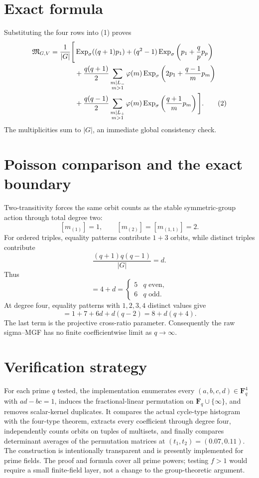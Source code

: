 \documentclass[11pt]{article}
\begin{document}
\section{Exact formula}
Substituting the four rows into (1) proves
\begin{align}
\mathfrak M_{G,V}=\frac1{|G|}\Bigg[&\operatorname{Exp}_{\sigma}((q+1)p_1)
+(q^2-1)\operatorname{Exp}_{\sigma}\left(p_1+\frac qp p_p\right)\notag\\
&+\frac{q(q+1)}2\sum_{\substack{m\mid L_-\\m>1}}\varphi(m)
 \operatorname{Exp}_{\sigma}\left(2p_1+\frac{q-1}{m}p_m\right)\notag\\
&+\frac{q(q-1)}2\sum_{\substack{m\mid L_+\\m>1}}\varphi(m)
 \operatorname{Exp}_{\sigma}\left(\frac{q+1}{m}p_m\right)\Bigg]. \tag{2}
\end{align}
The multiplicities sum to $|G|$, an immediate global consistency check.

\section{Poisson comparison and the exact boundary}
Two-transitivity forces the same orbit counts as the stable symmetric-group action through total degree two:
\[
 [m_{(1)}]=1,\qquad [m_{(2)}]=[m_{(1,1)}]=2.
\]
For ordered triples, equality patterns contribute $1+3$ orbits, while distinct triples contribute
\[
 \frac{(q+1)q(q-1)}{|G|}=d.
\]
Thus
\begin{equation}[m_{(1,1,1)}]=4+d=\begin{cases}5&q\text{ even},\\6&q\text{ odd}.\end{cases} \tag{3}\end{equation}
At degree four, equality patterns with $1,2,3,4$ distinct values give
\begin{equation}[m_{(1,1,1,1)}]=1+7+6d+d(q-2)=8+d(q+4). \tag{4}\end{equation}
The last term is the projective cross-ratio parameter.  Consequently the raw sigma--MGF has no finite coefficientwise limit as $q\to\infty$.

\section{Verification strategy}
For each prime $q$ tested, the implementation enumerates every
$(a,b,c,d)\in\mathbf F_q^4$ with $ad-bc=1$, induces the fractional-linear
permutation on $\mathbf F_q\cup\{\infty\}$, and removes scalar-kernel
duplicates.  It compares the actual cycle-type histogram with the four-type
theorem, extracts every coefficient through degree four, independently counts
orbits on tuples of multisets, and finally compares determinant averages of
the permutation matrices at $(t_1,t_2)=(0.07,0.11)$.
The construction is intentionally transparent and is presently implemented for prime fields.  The proof and formula cover all prime powers; testing $f>1$ would require a small finite-field layer, not a change to the group-theoretic argument.
\end{document}
